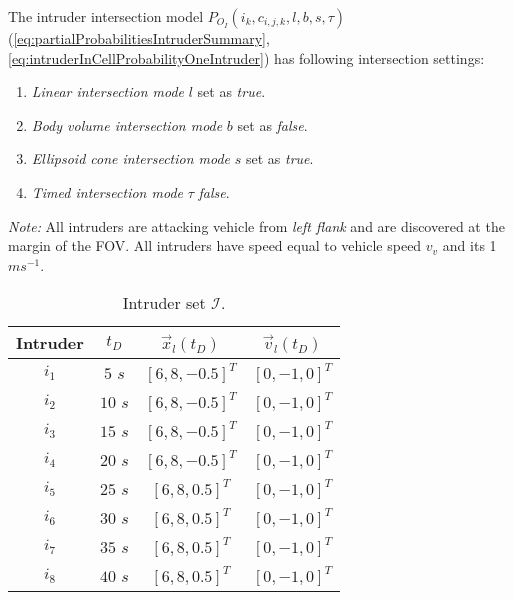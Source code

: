 The intruder intersection model $P_{O_I}(i_k,c_{i,j,k},l,b,s,\tau)$ (\ref{eq:partialProbabilitiesIntruderSummary},\ref{eq:intruderInCellProbabilityOneIntruder}) has following intersection settings:
\begin{enumerate}
    \item\emph{Linear intersection mode} $l$ set as \emph{true}.
    \item\emph{Body volume intersection mode} $b$ set as \emph{false}.
    \item\emph{Ellipsoid cone intersection mode} $s$ set as \emph{true}.
    \item\emph{Timed intersection mode} $\tau$ \emph{false}.
\end{enumerate}

\noindent\emph{Note:} All intruders are attacking vehicle from \emph{left flank} and are discovered at the margin of the FOV. All intruders have speed equal to vehicle speed $v_v$ and its 1 $ms^{-1}$.


\begin{table}[H]
    \centering
    \begin{tabular}{|c||c|c|c|}
        \hline
         Intruder & $t_D$    & $\vec{x}_{l}(t_D)$  & $\vec{v}_{l}(t_D)$ \\\hline\hline
         $i_1$    & $5$ $s$  & $[6,8,-0.5]^T$    & $[0,-1,0]^T$ \\\hline
         $i_2$    & $10$ $s$ & $[6,8,-0.5]^T$    & $[0,-1,0]^T$ \\\hline
         $i_3$    & $15$ $s$ & $[6,8,-0.5]^T$    & $[0,-1,0]^T$ \\\hline
         $i_4$    & $20$ $s$ & $[6,8,-0.5]^T$    & $[0,-1,0]^T$ \\\hline
         $i_5$    & $25$ $s$ & $[6,8,0.5]^T$     & $[0,-1,0]^T$ \\\hline
         $i_6$    & $30$ $s$ & $[6,8,0.5]^T$     & $[0,-1,0]^T$ \\\hline
         $i_7$    & $35$ $s$ & $[6,8,0.5]^T$     & $[0,-1,0]^T$ \\\hline
         $i_8$    & $40$ $s$ & $[6,8,0.5]^T$     & $[0,-1,0]^T$ \\\hline
    \end{tabular}
    \caption{Intruder set $\mathscr{I}$.}
    \label{tab:intruderSet}
\end{table}

